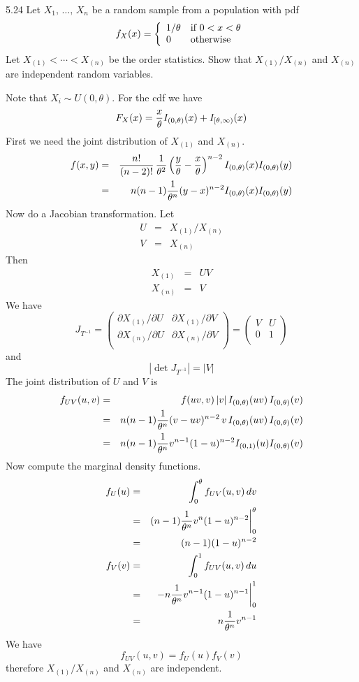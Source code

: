 \documentclass[12pt]{article}
\begin{document}
5.24
Let $X_1,\,\ldots,\,X_n$ be a random sample from a population with
pdf
$$
f_X(x)=\left\{
\begin{array}{ll}
1/\theta & \hbox{if $0<x<\theta$}\\
0 & \hbox{otherwise}
\end{array}\right.
$$
Let $X_{(1)}<\cdots<X_{(n)}$ be the order statistics.
Show that $X_{(1)}/X_{(n)}$ and $X_{(n)}$ are independent random
variables.

\bigskip
\noindent
Note that $X_i\sim U(0,\theta)$. For the cdf we have
$$F_X(x)={x\over\theta}I_{(0,\theta)}(x)+I_{[\theta,\infty)}(x)$$
First we need the joint distribution of $X_{(1)}$ and $X_{(n)}$.
\begin{eqnarray*}
f(x,y)&=&
{n!\over(n-2)!}
\,{1\over\theta^2}
\left({y\over\theta}-{x\over\theta}\right)^{n-2}
I_{(0,\theta)}(x)I_{(0,\theta)}(y)\\
&=&n(n-1){1\over\theta^n}
(y-x)^{n-2}I_{(0,\theta)}(x)I_{(0,\theta)}(y)
\end{eqnarray*}
Now do a Jacobian transformation.
Let
\begin{eqnarray*}
U&=&X_{(1)}/X_{(n)}\\
V&=&X_{(n)}
\end{eqnarray*}
Then
\begin{eqnarray*}
X_{(1)}&=&UV\\
X_{(n)}&=&V
\end{eqnarray*}
We have
$$J_{T^{-1}}=\left(\begin{matrix}
\partial X_{(1)}/\partial U &
\partial X_{(1)}/\partial V\\
\partial X_{(n)}/\partial U &
\partial X_{(n)}/\partial V\\
\end{matrix}\right)
=\left(\begin{matrix}
V & U\\
0 & 1\\
\end{matrix}\right)
$$
and
$$|\det J_{T^{-1}}|=|V|$$
The joint distribution of $U$ and $V$ is
\begin{eqnarray*}
f_{UV}(u,v)&=&f(uv,v)\,|v|\,
I_{(0,\theta)}(uv)\,I_{(0,\theta)}(v)\\
&=&
n(n-1)
{1\over\theta^n}
(v-uv)^{n-2}
\,v\,
I_{(0,\theta)}(uv)\,I_{(0,\theta)}(v)\\
&=&
n(n-1)
{1\over\theta^n}
v^{n-1}(1-u)^{n-2}
I_{(0,1)}(u)I_{(0,\theta)}(v)\\
\end{eqnarray*}
Now compute the marginal density functions.
\begin{eqnarray*}
f_U(u)&=&\int_0^\theta f_{UV}(u,v)\,dv\\
&=&(n-1)
{1\over\theta^n}
v^n
(1-u)^{n-2}\bigg|_0^\theta\\
&=&(n-1)(1-u)^{n-2}\\
%
f_V(v)&=&\int_0^1f_{UV}(u,v)\,du\\
&=&-n{1\over\theta^n}v^{n-1}(1-u)^{n-1}\bigg|_0^1\\
&=&n{1\over\theta^n}v^{n-1}
\end{eqnarray*}
We have
$$f_{UV}(u,v)=f_U(u)f_V(v)$$
therefore $X_{(1)}/X_{(n)}$ and $X_{(n)}$ are independent.
\end{document}

